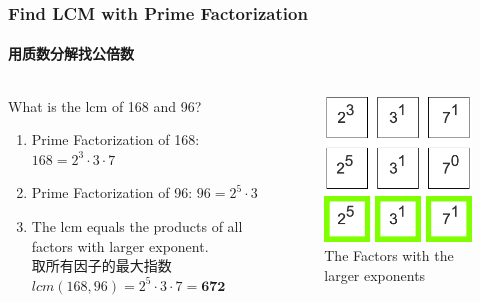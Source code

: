\documentclass[
	11pt, %
]{beamer}
\begin{document}
\begin{frame}	
	\frametitle{Find LCM with Prime Factorization}
	\framesubtitle{用质数分解找公倍数}
	\begin{columns}[t] %
			\begin{column}{0.45\textwidth} %
				What is the lcm of 168 and 96?
			 \begin{enumerate}
			 	\item Prime Factorization of 168: $168=2^3 \cdot 3 \cdot 7$
			 	\item Prime Factorization of 96: $96=2^5 \cdot 3$
			 	\item The lcm equals the products of all factors with larger exponent.\\ 取所有因子的最大指数 \\ $lcm(168, 96) = 2^5 \cdot 3 \cdot 7= \textbf{672}$
			 	\end{enumerate}
			\end{column}

			\begin{column}{0.5\textwidth} %
			  \begin{figure}
			    \includegraphics[width=0.8\linewidth]{168_96_LCM.png}
			    \caption{The Factors with the larger exponents}
		    \end{figure}
			\end{column}
	\end{columns}
\end{frame}
\end{document}
